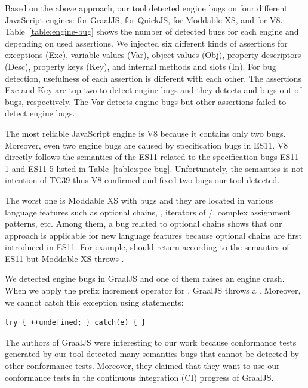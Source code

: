 Based on the above approach, our tool detected  engine bugs on four
different JavaScript engines: \inred{-} for GraalJS, \inred{-} for QuickJS,
\inred{-} for Moddable XS, and \inred{-} for V8.  Table~\ref{table:engine-bug}
shows the number of detected bugs for each engine and depending on used
assertions.  We injected six different kinds of assertions for exceptions
(\textsf{Exc}), variable values (\textsf{Var}), object values (\textsf{Obj}),
property descriptors (\textsf{Desc}), property keys (\textsf{Key}), and internal
methods and slots (\textsf{In}).  For bug detection, usefulness of each
assertion is different with each other.  The assertions \textsf{Exc} and
\textsf{Key} are top-two to detect engine bugs and they detects \inred{-} and
\inred{-} bugs out of  bugs, respectively.  The \textsf{Var} detects
\inred{-} engine bugs but other assertions failed to detect engine bugs.

The most reliable JavaScript engine is V8 because it contains only two bugs.
Moreover, even two engine bugs are caused by specification bugs in ES11.  V8
directly follows the semantics of the ES11 related to the specification bugs
ES11-1 and ES11-5 listed in Table~\ref{table:spec-bug}.  Unfortunately, the
semantics is not intention of TC39 thus V8 confirmed and fixed two bugs our tool
detected.

The worst one is Moddable XS with \inred{-} bugs and they are located in various
language features such as optional chains, ,
iterators of /, complex assignment patterns, etc.  Among
them, a bug related to optional chains shows that our approach is applicable for
new language features because optional chains are first introduced in ES11.
For example,  should return  according to
the semantics of ES11 but Moddable XS throws .

We detected \inred{-} engine bugs in GraalJS and one of them raises an engine
crash.  When we apply the prefix increment operator for ,
GraalJS throws a .  Moreover, we cannot
catch this exception using  statements:
\begin{lstlisting}[style=myJSstyle]
try { ++undefined; } catch(e) { }
\end{lstlisting}
The authors of GraalJS were interesting to our work because conformance tests
generated by our tool detected many semantics bugs that cannot be detected by
other conformance tests.  Moreover, they claimed that they want to use our
conformance tests in the continuous integration (CI) progress of GraalJS.

